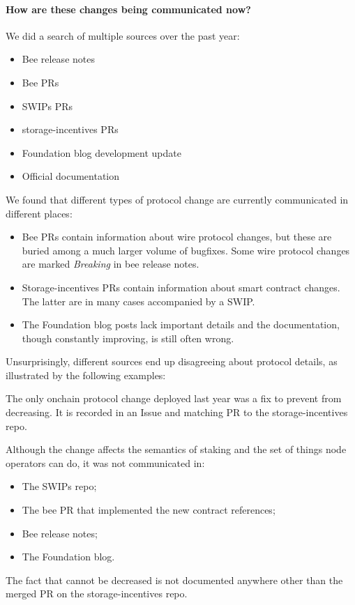 \paragraph{How are these changes being communicated now?} We did a search of multiple sources over the past year:

\begin{itemize}
\item Bee release notes
\item Bee PRs
\item SWIPs PRs
\item storage-incentives PRs
\item Foundation blog development update
\item Official documentation
\end{itemize}

We found that different types of protocol change are currently communicated in different places: 
%
\begin{itemize}
\item Bee PRs contain information about wire protocol changes, but these are buried among a much larger volume of bugfixes. Some wire protocol changes are marked \emph{Breaking} in bee release notes.
\item Storage-incentives PRs contain information about smart contract changes. The latter are in many cases accompanied by a SWIP.
\item The Foundation blog posts lack important details and the documentation, though constantly improving, is still often wrong.
\end{itemize}
%
Unsurprisingly, different sources end up disagreeing about protocol details, as illustrated by the following examples:

\begin{example*}

  The only onchain protocol change deployed last year was a fix to prevent  from decreasing. 
  It is recorded in an Issue and matching PR to the storage-incentives repo.

  Although the change affects the semantics of staking and the set of things node operators can do, it was not communicated in:
  \begin{itemize}
  \item The SWIPs repo;
  \item The bee PR that implemented the new contract references;
  \item Bee release notes;
  \item The Foundation blog.
  \end{itemize}
  The fact that  cannot be decreased is not documented anywhere other than the merged PR on the storage-incentives repo.

\end{example*}

